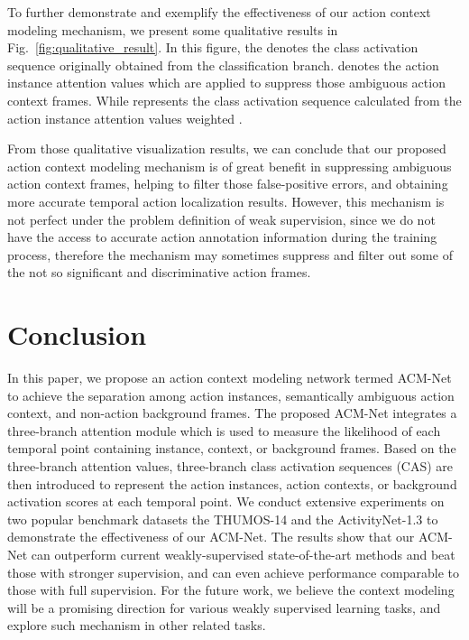 \documentclass[journal,comsoc]{IEEEtran}
\begin{document}
\par To further demonstrate and exemplify the effectiveness of our action context modeling mechanism, we present some qualitative results in Fig.~\ref{fig:qualitative_result}. In this figure, the  denotes the class activation sequence originally obtained from the classification branch.  denotes the action instance attention values which are applied to suppress those ambiguous action context frames. While  represents the class activation sequence calculated from the action instance attention values  weighted . 
\par From those qualitative visualization results, we can conclude that our proposed action context modeling mechanism is of great benefit in suppressing ambiguous action context frames, helping to filter those false-positive errors, and obtaining more accurate temporal action localization results. However, this mechanism is not perfect under the problem definition of weak supervision, since we do not have the access to accurate action annotation information during the training process, therefore the mechanism may sometimes suppress and filter out some of the not so significant and discriminative action frames.




\section{Conclusion}
\par In this paper, we propose an action context modeling network termed ACM-Net to achieve the separation among action instances, semantically ambiguous action context, and non-action background frames. The proposed ACM-Net integrates a three-branch attention module which is used to measure the likelihood of each temporal point containing instance, context, or background frames. Based on the three-branch attention values, three-branch class activation sequences (CAS) are then introduced to represent the action instances, action contexts, or background activation scores at each temporal point. We conduct extensive experiments on two popular benchmark datasets the THUMOS-14 and the ActivityNet-1.3 to demonstrate the effectiveness of our ACM-Net. The results show that our ACM-Net can outperform current weakly-supervised state-of-the-art methods and beat those with stronger supervision, and can even achieve performance comparable to those with full supervision. For the future work, we believe the context modeling will be a promising direction for various weakly supervised learning tasks, and explore such mechanism in other related tasks.
\end{document}
